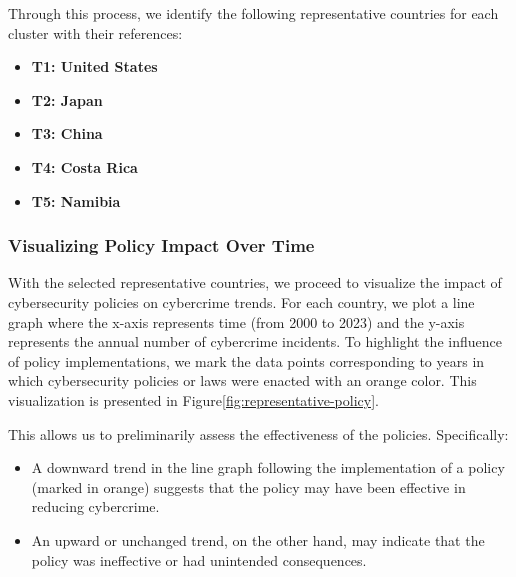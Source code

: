 Through this process, we identify the following representative countries for each cluster with their references:
\begin{itemize}
    \item \textbf{T1: United States}
    ~\cite{
        congress-website,
        nist-website,
        dhs-website,
        sec-website,
        whitehouse-website,
        investigatory-powers-act-2016,
        ncsc-uk,
        telecom-security-act-2021,
        uk-cyber-security-requirements-2024,
        uk-cybersecurity-timeline-2024}
    \item \textbf{T2: Japan}
    ~\cite{
        it-basic-law-japan,
        ppc-legal-japan,
        nisc-japan,
        mofa-japan,
        japan-law-translation,
        cs-strategy-2015-japan,
        cs-strategy-2018-japan,
        telecom-business-act-japan,
        cs-strategy-2021-japan}
    \item \textbf{T3: China}
    ~\cite{
        international-cybercrime,
        cybersecurity-law-china,
        internet-censorship-china,
        china-data-security-regulations,
        cryptography-law-china}
    \item \textbf{T4: Costa Rica}
    ~\cite{
        costa-rica-cybersecurity-strategy,
        costa-rica-pop-up}
    \item \textbf{T5: Namibia}
    ~\cite{
        namibia-pop-up,
        namibia-digital-odyssey,
        namibia-cybersecurity-strategy}
\end{itemize}

\subsubsection*{Visualizing Policy Impact Over Time} %
With the selected representative countries,
we proceed to visualize the impact of cybersecurity policies on cybercrime trends.
For each country, we plot a line graph where
the x-axis represents time (from 2000 to 2023) and the y-axis represents the annual number of cybercrime incidents.
To highlight the influence of policy implementations,
we mark the data points corresponding to years in which cybersecurity policies or laws were enacted with an orange color.
This visualization is presented in Figure\ref{fig:representative-policy}.

This allows us to preliminarily assess the effectiveness of the policies.
Specifically:
\begin{itemize}
    \item A downward trend in the line graph following the implementation of a policy (marked in orange)
    suggests that the policy may have been effective in reducing cybercrime.
    \item An upward or unchanged trend, on the other hand,
    may indicate that the policy was ineffective or had unintended consequences.
\end{itemize}


